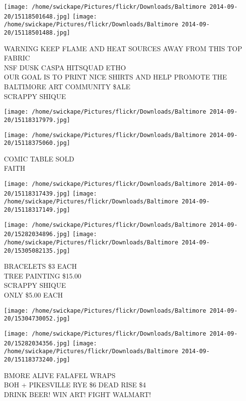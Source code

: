 \documentclass[10pt,letterpaper]{article}
\begin{document}
\texttt{[image: /home/swickape/Pictures/flickr/Downloads/Baltimore 2014-09-20/15118501648.jpg]}
\texttt{[image: /home/swickape/Pictures/flickr/Downloads/Baltimore 2014-09-20/15118501488.jpg]}

WARNING KEEP FLAME AND HEAT SOURCES AWAY FROM THIS TOP FABRIC\\
NSF DUSK CASPA HITSQUAD ETHO\\
OUR GOAL IS TO PRINT NICE SHIRTS AND HELP PROMOTE THE BALTIMORE ART COMMUNITY \$ALE\\
SCRAPPY SHIQUE
\pagebreak

\texttt{[image: /home/swickape/Pictures/flickr/Downloads/Baltimore 2014-09-20/15118317979.jpg]}

\vspace{0.25in}
\texttt{[image: /home/swickape/Pictures/flickr/Downloads/Baltimore 2014-09-20/15118375060.jpg]}

COMIC TABLE SOLD\\
FAITH
\pagebreak

\texttt{[image: /home/swickape/Pictures/flickr/Downloads/Baltimore 2014-09-20/15118317439.jpg]}
\texttt{[image: /home/swickape/Pictures/flickr/Downloads/Baltimore 2014-09-20/15118317149.jpg]}

\texttt{[image: /home/swickape/Pictures/flickr/Downloads/Baltimore 2014-09-20/15282034896.jpg]}
\texttt{[image: /home/swickape/Pictures/flickr/Downloads/Baltimore 2014-09-20/15305082135.jpg]}

BRACELETS \$3 EACH\\
TREE PAINTING \$15.00\\
SCRAPPY SHIQUE\\
ONLY \$5.00 EACH
\pagebreak

\texttt{[image: /home/swickape/Pictures/flickr/Downloads/Baltimore 2014-09-20/15304730052.jpg]}

\vspace{0.25in}
\texttt{[image: /home/swickape/Pictures/flickr/Downloads/Baltimore 2014-09-20/15282034356.jpg]}
\texttt{[image: /home/swickape/Pictures/flickr/Downloads/Baltimore 2014-09-20/15118373240.jpg]}

BMORE ALIVE FALAFEL WRAPS\\
BOH + PIKESVILLE RYE \$6 DEAD RISE \$4\\
DRINK BEER! WIN ART! FIGHT WALMART!
\pagebreak
\end{document}
